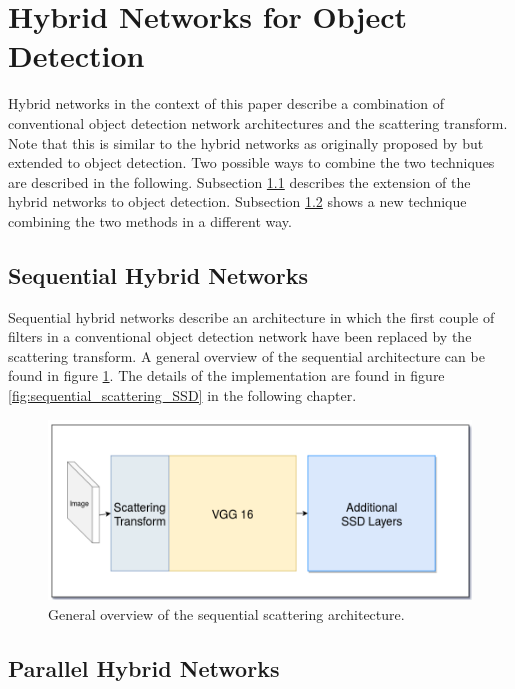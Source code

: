 \section{Hybrid Networks for Object Detection}
\label{sec:hybrid_networks_for_od}

Hybrid networks in the context of this paper describe a combination of conventional object detection network architectures and the scattering transform. Note that this is similar to the hybrid networks as originally proposed by \cite{ScalingTheScatteringTransform2017} but extended to object detection. Two possible ways to combine the two techniques are described in the following. Subsection \ref{subsec:sequential_hybrid} describes the extension of the hybrid networks to object detection. Subsection \ref{subsec:parallel_hybrid} shows a new technique combining the two methods in a different way. 

\subsection{Sequential Hybrid Networks}
\label{subsec:sequential_hybrid}

Sequential hybrid networks describe an architecture in which the first couple of filters in a conventional object detection network have been replaced by the scattering transform. A general overview of the sequential architecture can be found in figure \ref{fig:sequential_scattering_overview}. The details of the implementation are found in figure \ref{fig:sequential_scattering_SSD} in the following chapter. 

\begin{figure}[!htb]
	\centering
	\includegraphics[width=\textwidth]{images/sequential_scattering_overview.png}
	\caption{General overview of the sequential scattering architecture.}
	\label{fig:sequential_scattering_overview}	
\end{figure}


\subsection{Parallel Hybrid Networks}
\label{subsec:parallel_hybrid}

